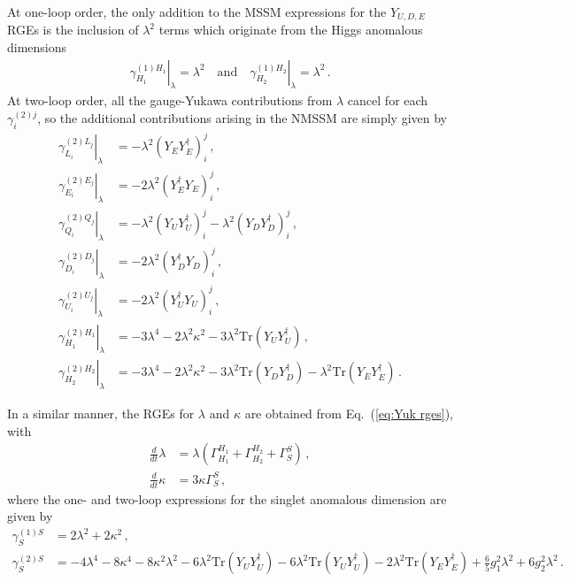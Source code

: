 \documentclass[final,3p,times,pdflatex]{elsarticle}
\newcommand{\lamsq}{\lambda^2}
\newcommand{\kapsq}{\kappa^2}
\newcommand{\tr}{\mathrm{Tr}}
\newcommand{\dt}{\frac{d}{dt}}
\begin{document}
At one-loop order, the only addition to the MSSM expressions 
\cite{MV94} for the $Y_{U,D,E}$ RGEs is the inclusion of $\lamsq$ terms 
which originate from the Higgs anomalous dimensions
%
\begin{align}
\left.\gamma^{(1) H_1}_{H_1}\right|_\lambda = \lamsq 
\quad \mbox{and} \quad \left.\gamma^{(1) H_2}_{H_2} \right|_\lambda = \lamsq\,.
\end{align}
%
At two-loop order, all the gauge-Yukawa contributions from $\lambda$ cancel for 
each $\gamma_i^{(2)j}$, so the additional contributions arising in the NMSSM are 
simply given by
%
\begin{align}
\left.\gamma_{L_i}^{(2)L_j}\right|_\lambda &= -\lamsq (Y_E Y_E^\dagger)_i^j\,, \\
%
\left.\gamma_{E_i}^{(2)E_j}\right|_\lambda &= -2\lamsq (Y_E^\dagger Y_E)_i^j\,, \\
%
\left.\gamma_{Q_i}^{(2)Q_j}\right|_\lambda &= -\lamsq (Y_U Y_U^\dagger)_i^j 
- \lamsq (Y_D Y_D^\dagger)_i^j\,, \\
%
\left.\gamma_{D_i}^{(2)D_j}\right|_\lambda &= -2\lamsq (Y_D^\dagger Y_D)_i^j\,, \\
%
\left.\gamma_{U_i}^{(2)U_j}\right|_\lambda &= -2\lamsq (Y_U^\dagger Y_U)_i^j \,, \\
%
\left.\gamma_{H_1}^{(2)H_1}\right|_\lambda &= -3\lambda^4 -2\lamsq\kapsq 
- 3\lamsq \tr(Y_U Y_U^\dagger)\,, \\
%
\left.\gamma_{H_2}^{(2)H_2}\right|_\lambda &= -3\lambda^4 -2\lamsq\kapsq 
- 3\lamsq \tr(Y_D Y_D^\dagger) - \lamsq \tr(Y_E Y_E^\dagger)\,.
\end{align}
%

In a similar manner, the RGEs for $\lambda$ and $\kappa$ are obtained from Eq.~(\ref{eq:Yuk rges}), with
\begin{align}
\dt\lambda &= \lambda (\Gamma^{H_1}_{H_1} + \Gamma^{H_2}_{H_2} + \Gamma^S_S)\,, \\
%
\dt\kappa &= 3\kappa \Gamma_S^S\,,
\end{align}
%
where the one- and two-loop expressions for the singlet anomalous dimension 
are given by
%
\begin{align}
\gamma_S^{(1)S} &= 2\lamsq + 2\kapsq\,,\\
%
\gamma_S^{(2)S} &= -4\lambda^4 - 8\kappa^4 - 8 \kapsq\lamsq 
- 6\lamsq \tr(Y_UY_U^\dagger) - 6\lamsq \tr(Y_UY_U^\dagger) 
- 2\lamsq \tr(Y_EY_E^\dagger) + \tfrac{6}{5}g_1^2\lamsq + 6g_2^2\lamsq\,.
\end{align} 
\end{document}
